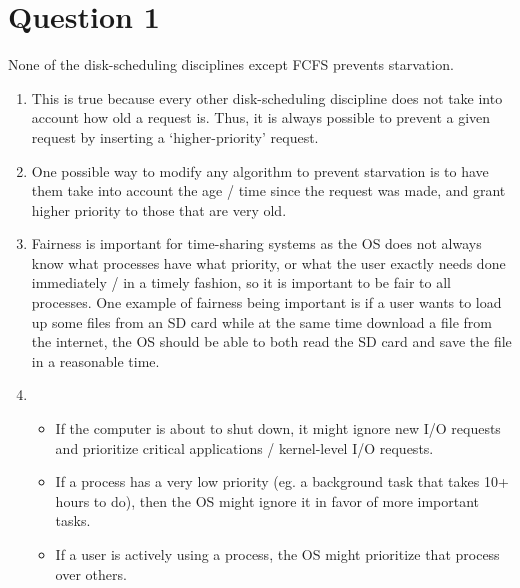 \documentclass{article}
\begin{document}
\section*{Question 1}
None of the disk-scheduling disciplines except FCFS prevents starvation.

\begin{enumerate}[label=\alph*.]
    \item This is true because every other disk-scheduling discipline does not
          take into account how old a request is. Thus, it is always possible to
          prevent a given request by inserting a `higher-priority' request.
    \item One possible way to modify any algorithm to prevent starvation is to
          have them take into account the age / time since the request was made, and
          grant higher priority to those that are very old.
    \item Fairness is important for time-sharing systems as the OS does not
          always know what processes have what priority, or what the user
          exactly needs done immediately / in a timely fashion, so it is
          important to be fair to all processes. One example of fairness being
          important is if a user wants to load up some files from an SD card
          while at the same time download a file from the internet, the OS
          should be able to both read the SD card and save the file in a
          reasonable time.
    \item \begin{itemize}
              \item If the computer is about to shut down, it might ignore new
                    I/O requests and prioritize critical applications / kernel-level
                    I/O requests.
              \item If a process has a very low priority (eg. a background task
                    that takes 10+ hours to do), then the OS might ignore it in favor
                    of more important tasks.
              \item If a user is actively using a process, the OS might
                    prioritize that process over others.
          \end{itemize}
\end{enumerate}
\end{document}
